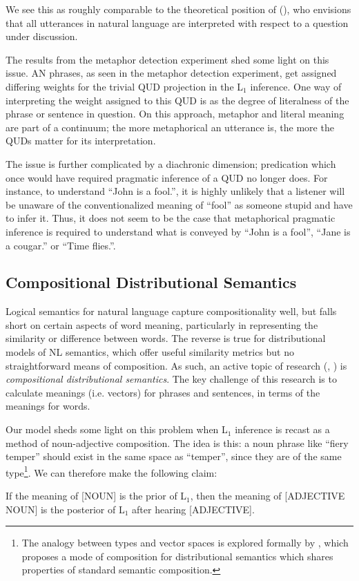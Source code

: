 \documentclass[10pt,letterpaper,twocolumn]{article}
\begin{document}
We see this as roughly comparable to the theoretical position of (\cite{roberts1996information}), who envisions that all utterances in natural language are interpreted with respect to a question under discussion. 

The results from the metaphor detection experiment shed some light on this issue. AN phrases, as seen in the metaphor detection experiment, get assigned differing weights for the trivial QUD projection in the L$_1$ inference. One way of interpreting the weight assigned to this QUD is as the degree of literalness of the phrase or sentence in question. On this approach, metaphor and literal meaning are part of a continuum; the more metaphorical an utterance is, the more the QUDs matter for its interpretation.



The issue is further complicated by a diachronic dimension; predication which once would have required pragmatic inference of a QUD no longer does. For instance, to understand ``John is a fool.'', it is highly unlikely that a listener will be unaware of the conventionalized meaning of ``fool'' as someone stupid and have to infer it. Thus, it does not seem to be the case that metaphorical pragmatic inference is required to understand what is conveyed by ``John is a fool'', ``Jane is a cougar.'' or ``Time flies.''.  

\subsection{Compositional Distributional Semantics}

Logical semantics for natural language capture compositionality well, but falls short on certain aspects of word meaning, particularly in representing the similarity or difference between words. The reverse is true for distributional models of NL semantics, which offer useful similarity metrics but no straightforward means of composition. As such, an active topic of research (\cite{socher2013recursive}, \cite{coecke2010mathematical}) is \emph{compositional distributional semantics}. The key challenge of this research is to calculate meanings (i.e. vectors) for phrases and sentences, in terms of the meanings for words.

Our model sheds some light on this problem when L$_1$ inference is recast as a method of noun-adjective composition. The idea is this: a noun phrase like ``fiery temper'' should exist in the same space as ``temper'', since they are of the same type\footnote{The analogy between types and vector spaces is explored formally by \cite{coecke2010mathematical}, which proposes a mode of composition for distributional semantics which shares properties of standard semantic composition.}. We can therefore make the following claim:
\begin{exe}
\ex If the meaning of [NOUN] is the prior of L$_1$, then the meaning of [ADJECTIVE NOUN] is the posterior of L$_1$ after hearing [ADJECTIVE]. \label{prop1}
\end{exe}
\end{document}
